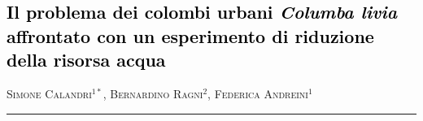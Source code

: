 \setcounter{figure}{0}
\setcounter{table}{0}


\begin{adjustwidth}{-3.5cm}{0cm}
\pagestyle{CIOpage}
\chapter*[Colombi urbani e la riduzione della
risorsa acqua]{\textcolor{black}{Il problema dei colombi
urbani} \textbf{\textit{\textcolor{black}{Columba
livia }}}\textbf{\textcolor{black}{affrontato con un
esperimento di riduzione della risorsa acqua}}}

\textsc{Simone Calandri}$^{1*}$, \textsc{Bernardino Ragni}$^{2}$, 
\textsc{Federica Andreini}$^{1}$ \\

  
\noindent\color{MUSEBLUE}\rule{27cm}{2pt}
\vspace{1cm}
\end{adjustwidth}



